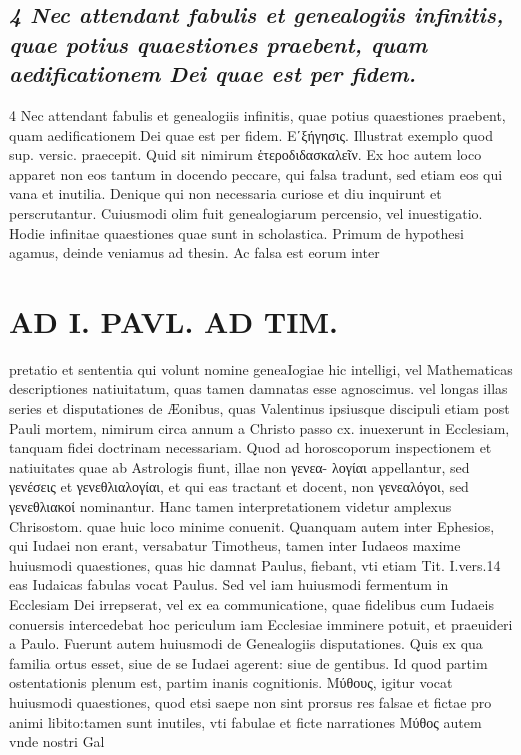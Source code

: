 \documentclass{article}
\begin{document}
\begin{pages}
\subsection*{\textit{4 Nec attendant fabulis et genealogiis infinitis, quae potius quaestiones praebent, quam aedificationem Dei quae est per fidem.}}4 Nec attendant fabulis et genealogiis infinitis, quae potius quaestiones praebent, quam aedificationem Dei quae est per fidem. Εʹξήγησις. Illustrat exemplo quod sup. versic. praecepit. Quid sit nimirum ἑτεροδιδασκαλεῖν. Ex hoc autem loco apparet non eos tantum in docendo peccare, qui falsa tradunt, sed etiam eos qui vana et inutilia. Denique qui non necessaria curiose et diu inquirunt et perscrutantur. Cuiusmodi olim fuit genealogiarum percensio, vel inuestigatio. Hodie infinitae quaestiones quae sunt in scholastica. Primum de hypothesi agamus, deinde veniamus ad thesin. Ac falsa est eorum inter\pend
\section*{AD I. PAVL. AD TIM. }
\marginpar{[ p.1O ]}\pstart pretatio et sententia qui volunt nomine geneaIogiae hic intelligi, vel Mathematicas descriptiones natiuitatum, quas tamen damnatas esse agnoscimus. vel longas illas series et disputationes de Æonibus, quas Valentinus ipsiusque discipuli etiam post Pauli mortem, nimirum circa annum a Christo passo cx. inuexerunt in Ecclesiam, tanquam fidei doctrinam necessariam. Quod ad horoscoporum inspectionem et natiuitates quae ab Astrologis fiunt, illae non γενεα- λογίαι appellantur, sed γενέσεις et γενεθλιαλογίαι, et qui eas tractant et docent, non γενεαλόγοι, sed γενεθλιακοί nominantur. Hanc tamen interpretationem videtur amplexus Chrisostom. quae huic loco minime conuenit. Quanquam autem inter Ephesios, qui Iudaei non erant, versabatur Timotheus, tamen inter Iudaeos maxime huiusmodi quaestiones, quas hic damnat Paulus, fiebant, vti etiam Tit. I.vers.14 eas Iudaicas fabulas vocat Paulus. Sed vel iam huiusmodi fermentum in Ecclesiam Dei irrepserat, vel ex ea communicatione, quae fidelibus cum Iudaeis conuersis intercedebat hoc periculum iam Ecclesiae imminere potuit, et praeuideri a Paulo. Fuerunt autem huiusmodi de Genealogiis disputationes. Quis ex qua familia ortus esset, siue de se Iudaei agerent: siue de gentibus. Id quod partim ostentationis plenum est, partim inanis cognitionis. Μύθους, igitur vocat huiusmodi quaestiones, quod etsi saepe non sint prorsus res falsae et fictae pro animi libito:tamen sunt inutiles, vti fabulae et ficte narrationes Μύθος autem vnde nostri Gal\pend

\end{pages}
\end{document}
